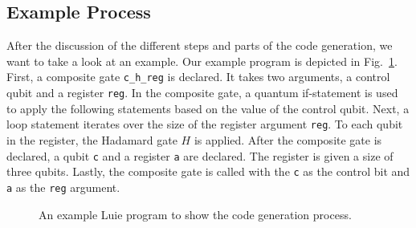 \subsection{Example Process}
\label{sec:implementation_codeGen_example}
After the discussion of the different steps and parts of the code generation, we want to take a look at an example. Our example program is depicted in Fig.~\ref{fig:codeGen_source_example}. First, a composite gate \texttt{c\_h\_reg} is declared. It takes two arguments, a control qubit and a register \texttt{reg}. In the composite gate, a quantum if-statement is used to apply the following statements based on the value of the control qubit. Next, a loop statement iterates over the size of the register argument \texttt{reg}. To each qubit in the register, the Hadamard gate $H$ is applied. After the composite gate is declared, a qubit \texttt{c} and a register \texttt{a} are declared. The register is given a size of three qubits. Lastly, the composite gate is called with the \texttt{c} as the control bit and \texttt{a} as the \texttt{reg} argument.

\begin{figure}
    \centering
    
    \caption{An example Luie program to show the code generation process.}
    \label{fig:codeGen_source_example}
\end{figure}

